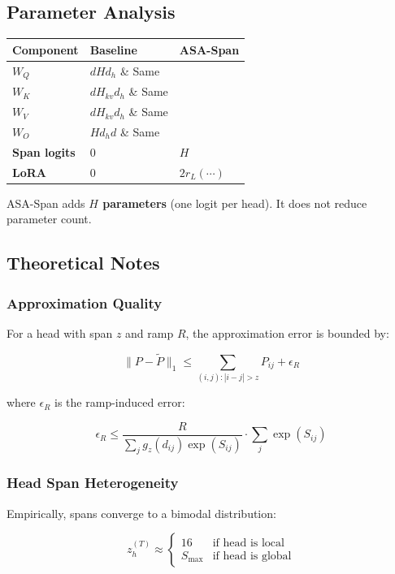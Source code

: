 \subsection{Parameter Analysis}

\begin{table}[H]
\centering
\small
\begin{tabular}{lll}
\toprule
\textbf{Component} & \textbf{Baseline} & \textbf{ASA-Span} \\
\midrule
$W_Q$ & $d H d_h$ \& Same \\
$W_K$ & $d H_{kv} d_h$ \& Same \\
$W_V$ & $d H_{kv} d_h$ \& Same \\
$W_O$ & $H d_h d$ \& Same \\
\textbf{Span logits} & 0 & \textbf{$H$} \\
\textbf{LoRA} & 0 & $2 r_L (\cdots)$ \\
\bottomrule
\end{tabular}
\end{table}

ASA-Span adds \textbf{$H$ parameters} (one logit per head). It does not reduce 
parameter count.

\subsection{Theoretical Notes}

\subsubsection{Approximation Quality}

For a head with span $z$ and ramp $R$, the approximation error is bounded by:

\[
\|P - \tilde{P}\|_1 \leq \sum_{(i,j) : |i-j| > z} P_{ij} + \epsilon_R
\]

where $\epsilon_R$ is the ramp-induced error:

\[
\epsilon_R \leq \frac{R}{\sum_j g_z(d_{ij}) \exp(S_{ij})} \cdot \sum_j \exp(S_{ij})
\]

\subsubsection{Head Span Heterogeneity}

Empirically, spans converge to a bimodal distribution:

\[
z_h^{(T)} \approx \begin{cases} 16 & \text{if head is local} \\ S_\text{max} & \text{if head is global} \end{cases}
\]

